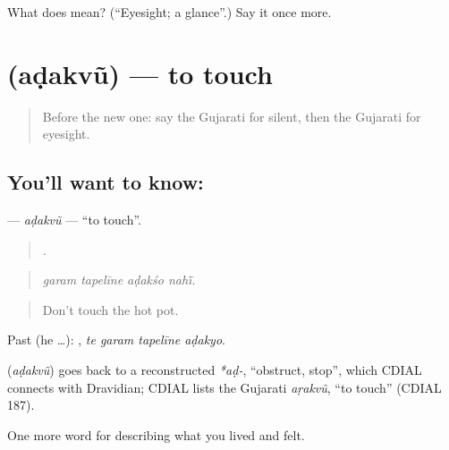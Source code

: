 \begin{tcolorbox}[breakable,colback=teal!4,colframe=teal!35!black,title={Before you move on}]
What does  mean? (\textquotedblleft{}Eyesight; a glance\textquotedblright{}.) Say it once more.
\end{tcolorbox}
\section[\texorpdfstring{\gu{અડકવું} (aḍakvũ)}{અડકવું (aḍakvũ)}]{ (aḍakvũ) — to touch}

\label{lesson:GU-C475-adakvu}



\begin{quote}
Before the new one: say the Gujarati for silent, then the Gujarati for eyesight.
\end{quote}

\subsection*{You'll want to know: }
\textbf{} — \emph{aḍakvũ} — \textquotedblleft{}to touch\textquotedblright{}.

\begin{quote}
   .
\end{quote}

\begin{quote}
\emph{garam tapelīne aḍakśo nahī̃.}
\end{quote}

\begin{quote}
Don't touch the hot pot.
\end{quote}

Past (he …):    , \emph{te garam tapelīne aḍakyo}.

\begin{cousinweb}
\textbf{} (\emph{aḍakvũ}) goes back to a reconstructed \emph{*aḍ-}, \textquotedblleft{}obstruct, stop\textquotedblright{}, which CDIAL connects with Dravidian; CDIAL lists the Gujarati \emph{aṛakvũ}, \textquotedblleft{}to touch\textquotedblright{} (CDIAL 187).
\end{cousinweb}

\begin{grammarlens}[title={What you've built}]
One more word for describing what you lived and felt.
\end{grammarlens}

